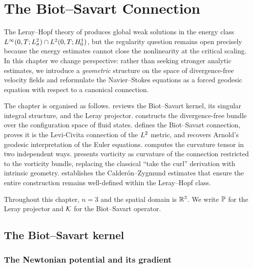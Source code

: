 \chapter{The Biot--Savart Connection}\label{ch:connection}

The Leray--Hopf theory of  produces global weak solutions in the
energy class $L^{\infty}(0,T;L^{2}_\sigma) \cap L^{2}(0,T;H^{1}_0)$, but the regularity
question remains open precisely because the energy estimates cannot close the nonlinearity
at the critical scaling.  In this chapter we change perspective: rather than seeking
stronger analytic estimates, we introduce a \emph{geometric} structure on the space of
divergence-free velocity fields and reformulate the Navier--Stokes equations as a forced
geodesic equation with respect to a canonical connection.

The chapter is organised as follows.   reviews the Biot--Savart
kernel, its singular integral structure, and the Leray projector.
 constructs the divergence-free bundle over the configuration space
of fluid states.   defines the Biot--Savart connection,
proves it is the Levi-Civita connection of the $L^{2}$ metric, and recovers Arnold's
geodesic interpretation of the Euler equations.   computes
the curvature tensor in two independent ways.   presents
vorticity as curvature of the connection restricted to the vorticity bundle, replacing
the classical ``take the curl'' derivation with intrinsic geometry.
 establishes the Calder\'{o}n--Zygmund estimates that ensure
the entire construction remains well-defined within the Leray--Hopf class.

Throughout this chapter, $n = 3$ and the spatial domain is $\mathbb{R}^3$.
We write $\mathbb{P}$ for the Leray projector and $\mathcal{K}$ for the Biot--Savart operator.

\section{The Biot--Savart kernel}\label{sec:bs-kernel}

\subsection{The Newtonian potential and its gradient}

